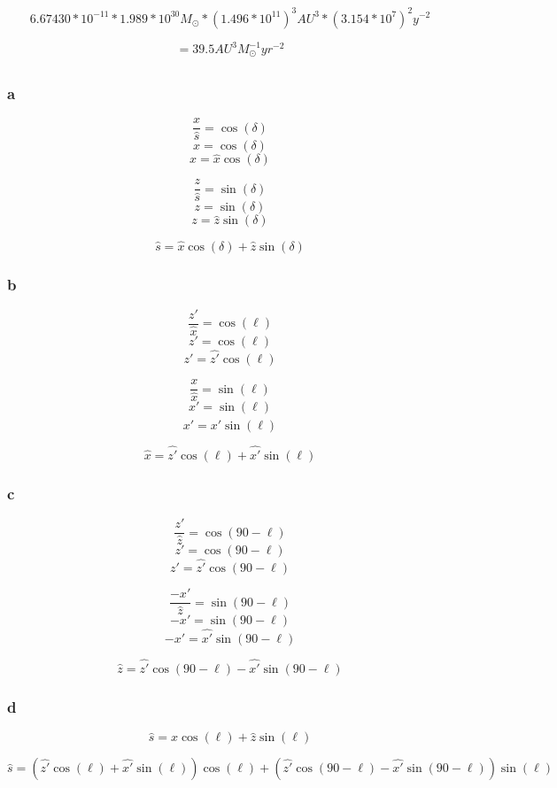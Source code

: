 \documentclass{article}
\begin{document}
\[6.67430 * 10^{-11} * 1.989 * 10^{30} M_{\odot} * {(1.496 * 10^{11})}^3 AU^3 * {(3.154 * 10^7)}^2 y^{-2}\] 

\[ = 39.5 AU^{3} M_{\odot}^{-1} yr^{-2}\]

\subsection{}

\subsubsection{a}

\[\frac{x}{\hat{s}} = \cos(\delta)\]
\[x = \cos(\delta)\]
\[x = \hat{x}\cos(\delta)\]

\[\frac{z}{\hat{s}} = \sin(\delta)\]
\[z = \sin(\delta)\]
\[z = \hat{z}\sin(\delta)\]

\[\hat{s} = \hat{x}\cos(\delta) + \hat{z}\sin(\delta) \]

\subsubsection{b}

\[\frac{z'}{\hat{x}} = \cos(\ell)\]
\[z' = \cos(\ell)\]
\[z' = \hat{z'}\cos(\ell)\]

\[\frac{x}{\hat{x}} = \sin(\ell)\]
\[x' = \sin(\ell)\]
\[x' = \hat{x'}\sin(\ell)\]

\[\hat{x} = \hat{z'}\cos(\ell) + \hat{x'}\sin(\ell)\]

\subsubsection{c}

\[\frac{z'}{\hat{z}} = \cos(90 - \ell)\]
\[z' = \cos(90 - \ell)\]
\[z' = \hat{z'}\cos(90 - \ell)\]

\[\frac{-x'}{\hat{z}} = \sin(90 - \ell)\]
\[-x' = \sin(90 - \ell)\]
\[-x' = \hat{x'}\sin(90 - \ell)\]

\[\hat{z} = \hat{z'}\cos(90 - \ell) - \hat{x'}\sin(90 - \ell)\]

\subsubsection{d}

\[\hat{s} = \hat{x}\cos(\ell) + \hat{z}\sin(\ell) \]

\[\hat{s} = (\hat{z'}\cos(\ell) + \hat{x'}\sin(\ell))\cos(\ell) + (\hat{z'}\cos(90 - \ell) - \hat{x'}\sin(90 - \ell))\sin(\ell)\]
\end{document}
